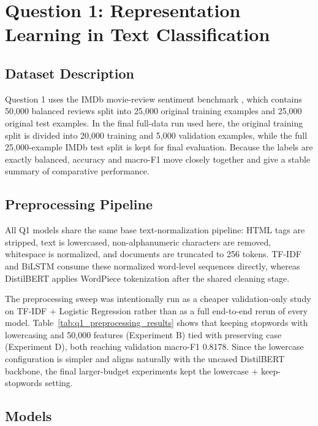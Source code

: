 \section{Question 1: Representation Learning in Text Classification}

\subsection{Dataset Description}

Question 1 uses the IMDb movie-review sentiment benchmark \cite{maas2011imdb}, which contains 50{,}000 balanced reviews split into 25{,}000 original training examples and 25{,}000 original test examples. In the final full-data run used here, the original training split is divided into 20{,}000 training and 5{,}000 validation examples, while the full 25{,}000-example IMDb test split is kept for final evaluation. Because the labels are exactly balanced, accuracy and macro-F1 move closely together and give a stable summary of comparative performance.

\subsection{Preprocessing Pipeline}

All Q1 models share the same base text-normalization pipeline: HTML tags are stripped, text is lowercased, non-alphanumeric characters are removed, whitespace is normalized, and documents are truncated to 256 tokens. TF-IDF and BiLSTM consume these normalized word-level sequences directly, whereas DistilBERT applies WordPiece tokenization after the shared cleaning stage.

The preprocessing sweep was intentionally run as a cheaper validation-only study on TF-IDF + Logistic Regression rather than as a full end-to-end rerun of every model. Table~\ref{tab:q1_preprocessing_results} shows that keeping stopwords with lowercasing and 50{,}000 features (Experiment B) tied with preserving case (Experiment D), both reaching validation macro-F1 0.8178. Since the lowercase configuration is simpler and aligns naturally with the uncased DistilBERT backbone, the final larger-budget experiments kept the lowercase + keep-stopwords setting.



\subsection{Models}

